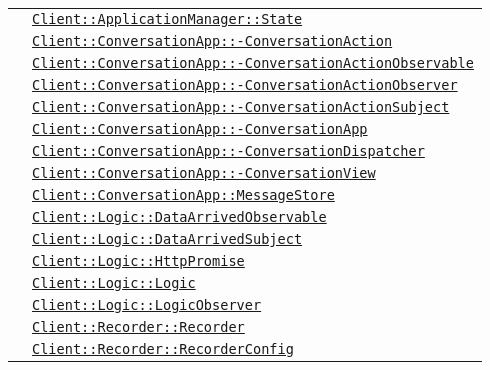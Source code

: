 \begin{longtable}{|>{\centering}m{3cm}|m{10cm}<{\centering}|}
& \hyperref[Client::ApplicationManager::State]{\texttt{Client::ApplicationManager::State}}\\
& \hyperref[Client::ConversationApp::ConversationAction]{\texttt{Client::ConversationApp::-\linebreak ConversationAction}}\\
& \hyperref[Client::ConversationApp::ConversationActionObservable]{\texttt{Client::ConversationApp::-\linebreak ConversationActionObservable}}\\
& \hyperref[Client::ConversationApp::ConversationActionObserver]{\texttt{Client::ConversationApp::-\linebreak ConversationActionObserver}}\\
& \hyperref[Client::ConversationApp::ConversationActionSubject]{\texttt{Client::ConversationApp::-\linebreak ConversationActionSubject}}\\
& \hyperref[Client::ConversationApp::ConversationApp]{\texttt{Client::ConversationApp::-\linebreak ConversationApp}}\\
& \hyperref[Client::ConversationApp::ConversationDispatcher]{\texttt{Client::ConversationApp::-\linebreak ConversationDispatcher}}\\
& \hyperref[Client::ConversationApp::ConversationView]{\texttt{Client::ConversationApp::-\linebreak ConversationView}}\\
& \hyperref[Client::ConversationApp::MessageStore]{\texttt{Client::ConversationApp::MessageStore}}\\
& \hyperref[Client::Logic::DataArrivedObservable]{\texttt{Client::Logic::DataArrivedObservable}}\\
& \hyperref[Client::Logic::DataArrivedSubject]{\texttt{Client::Logic::DataArrivedSubject}}\\
& \hyperref[Client::Logic::HttpPromise]{\texttt{Client::Logic::HttpPromise}}\\
& \hyperref[Client::Logic::Logic]{\texttt{Client::Logic::Logic}}\\
& \hyperref[Client::Logic::LogicObserver]{\texttt{Client::Logic::LogicObserver}}\\
& \hyperref[Client::Recorder::Recorder]{\texttt{Client::Recorder::Recorder}}\\
& \hyperref[Client::Recorder::RecorderConfig]{\texttt{Client::Recorder::RecorderConfig}}\\

\end{longtable}
